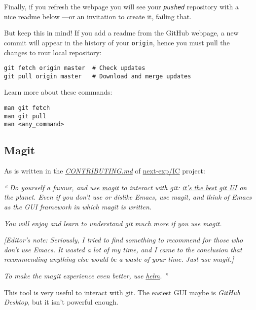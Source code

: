 Finally, if you refresh the webpage you will see your \textit{\texttt{pushed}} repository with a nice readme below ---or an invitation to create it, failing that.

But keep this in mind! If you add a readme from the \textsf{GitHub} webpage, a new commit will appear in the history of your \texttt{origin}, hence you must pull the changes to rour local repository:
\begin{lstlisting}[style=shell]
git fetch origin master  # Check updates
git pull origin master   # Download and merge updates
\end{lstlisting}

Learn more about these commands:
\begin{lstlisting}[style=shell]
man git fetch
man git pull
man <any_command>
\end{lstlisting}

\subsection{Magit}

As is written in the \href{https://github.com/next-exp/IC/blob/master/CONTRIBUTING.md#use-a-higher-level-git-interface}{\textit{CONTRIBUTING.md}} of \href{https://github.com/next-exp/IC}{\textsf{next-exp/IC}} project:

\vspace{8pt}

{\Large \textit{``}}
\textit{Do yourself a favour, and use \href{https://magit.vc/}{magit} to interact with git: \href{https://magit.vc/quotes/}{it's the best git UI} on the planet. Even if you don't use or dislike Emacs, use magit, and think of Emacs as the GUI framework in which magit is written.}

\textit{You will enjoy and learn to understand git much more if you use magit.}

\textit{[Editor's note: Seriously, I tried to find something to recommend for those who don't use Emacs. It wasted a lot of my time, and I came to the conclusion that recommending anything else would be a waste of your time. Just use magit.]}

\textit{To make the magit experience even better, use \href{https://emacs-helm.github.io/helm/}{helm}.}
{\Large \textit{''}}

\vspace{8pt}

This tool is very useful to interact with git. The easiest GUI maybe is \textit{GitHub Desktop}, but it isn't powerful enough.
